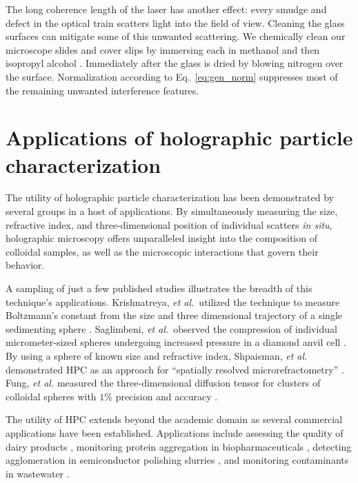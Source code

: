 The long coherence length of the laser has another effect: every
smudge and defect in the optical train scatters light into the field of view. Cleaning
the glass surfaces can mitigate some of this unwanted scattering.
We chemically clean our microscope slides and cover slips
by immersing each in methanol and then isopropyl alcohol \cite{goldfinger1970}. Immediately
after the glass is dried by blowing nitrogen over the surface.
Normalization according to Eq.~\ref{eq:gen_norm} suppresses most of the remaining
unwanted interference features.

\section{Applications of holographic particle characterization}

The utility of holographic particle characterization has been demonstrated by several groups
in a host of applications\cite{lee07a,fung12,saglimbeni16}. By simultaneously measuring the size, refractive index,
and three-dimensional position of individual scatters {\it in situ}, holographic
microscopy offers unparalleled insight into the composition of colloidal samples, as well
as the microscopic interactions that govern their behavior.

A sampling of just a few published studies illustrates the breadth of this
technique's applications. Krishnatreya, \emph{et al.}~utilized the technique to
measure Boltzmann's constant from the size and three dimensional trajectory of
a single sedimenting sphere \cite{krishnatreya14}. Saglimbeni,
\emph{et al.}~observed the compression of individual micrometer-sized
spheres undergoing increased pressure in a diamond anvil cell
\cite{saglimbeni16}. By using a
sphere of known size and refractive index,
Shpaisman, \emph{et al.} demonstrated HPC as an approach for
``spatially resolved microrefractometry'' \cite{shpaisman12}.
Fung, \emph{et al.} measured the three-dimensional diffusion tensor for
clusters of colloidal spheres with $\num{1}$\% precision and accuracy \cite{fung13}.

The utility of HPC extends beyond the academic domain as several commercial
applications have been established. Applications include assessing the quality of dairy
products \cite{cheong09a}, monitoring protein aggregation in biopharmaceuticals \cite{wang16}, detecting agglomeration in semiconductor polishing slurries \cite{cheong17}, 
and monitoring contaminants in wastewater \cite{philips17}.
